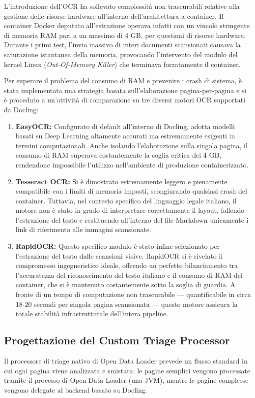 L'introduzione dell'OCR ha sollevato complessità non trascurabili relative alla gestione delle risorse hardware all'interno dell'architettura a container. Il container Docker deputato all'estrazione operava infatti con un vincolo stringente di memoria RAM pari a un massimo di 4 GB, per questioni di risorse hardware. Durante i primi test, l'invio massivo di interi documenti scansionati causava la saturazione istantanea della memoria, provocando l'intervento del modulo del kernel Linux (\textit{Out-Of-Memory Killer}) che terminava forzatamente il container.

Per superare il problema del consumo di RAM e prevenire i crash di sistema, è stata implementata una strategia basata sull'elaborazione pagina-per-pagina e si è proceduto a un'attività di comparazione su tre diversi motori OCR supportati da Docling:
\begin{enumerate}
    \item \textbf{EasyOCR:} Configurato di default all'interno di Docling, adotta modelli basati su Deep Learning altamente accurati ma estremamente esigenti in termini computazionali. Anche isolando l'elaborazione sulla singola pagina, il consumo di RAM superava costantemente la soglia critica dei 4 GB, rendendone impossibile l'utilizzo nell'ambiente di produzione containerizzato.
    \item \textbf{Tesseract OCR:} Si è dimostrato estremamente leggero e pienamente compatibile con i limiti di memoria imposti, scongiurando qualsiasi crash del container. Tuttavia, nel contesto specifico del linguaggio legale italiano, il motore non è stato in grado di interpretare correttamente il layout, fallendo l'estrazione del testo e restituendo all'interno del file Markdown unicamente i link di riferimento alle immagini scansionate.
    \item \textbf{RapidOCR:} Questo specifico modulo è stato infine selezionato per l'estrazione del testo dalle scansioni visive. RapidOCR si è rivelato il compromesso ingegneristico ideale, offrendo un perfetto bilanciamento tra l'accuratezza del riconoscimento del testo italiano e il consumo di RAM del container, che si è mantenuto costantemente sotto la soglia di guardia. A fronte di un tempo di computazione non trascurabile — quantificabile in circa 18-20 secondi per singola pagina scansionata — questo motore assicura la totale stabilità infrastrutturale dell'intera pipeline.
\end{enumerate}

\subsection{Progettazione del Custom Triage Processor}
Il processore di triage nativo di Open Data Loader prevede un flusso standard in cui ogni pagina viene analizzata e smistata: le pagine semplici vengono processate tramite il processo di Open Data Loader (una JVM), mentre le pagine complesse vengono delegate al backend basato su Docling. 

